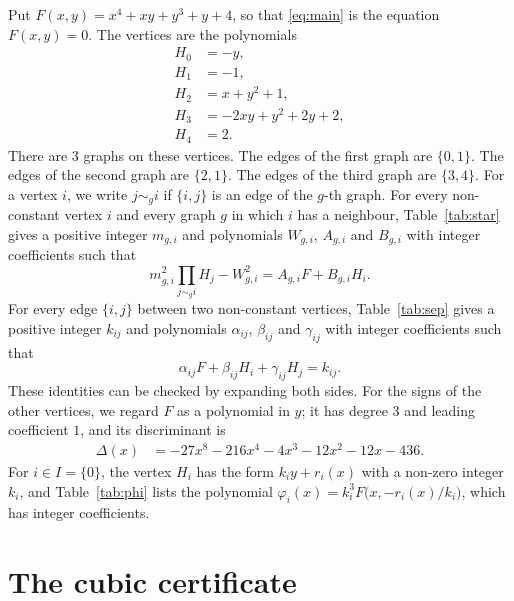 \documentclass[11pt]{article}
\begin{document}
Put $F(x,y)=x^{4}+xy+y^{3}+y+4$, so that \eqref{eq:main} is the equation $F(x,y)=0$. The vertices are the polynomials
\begin{align*}
H_{0}&=-y,\\
H_{1}&=-1,\\
H_{2}&=x+y^{2}+1,\\
H_{3}&=-2xy+y^{2}+2y+2,\\
H_{4}&=2.
\end{align*}
There are 3 graphs on these vertices. The edges of the first graph are $\{0,1\}$. The edges of the second graph are $\{2,1\}$. The edges of the third graph are $\{3,4\}$. For a vertex $i$, we write $j\sim_g i$ if $\{i,j\}$ is an edge of the $g$-th graph.
For every non-constant vertex $i$ and every graph $g$ in which $i$ has a neighbour, Table~\ref{tab:star} gives a positive integer $m_{g,i}$ and polynomials $W_{g,i}$, $A_{g,i}$ and $B_{g,i}$ with integer coefficients such that
\begin{equation}\label{eq:star}
m_{g,i}^2\prod_{j\sim_g i}H_j-W_{g,i}^2=A_{g,i}F+B_{g,i}H_i.
\end{equation}
For every edge $\{i,j\}$ between two non-constant vertices, Table~\ref{tab:sep} gives a positive integer $k_{ij}$ and polynomials $\alpha_{ij}$, $\beta_{ij}$ and $\gamma_{ij}$ with integer coefficients such that
\begin{equation}\label{eq:sep}
\alpha_{ij}F+\beta_{ij}H_i+\gamma_{ij}H_j=k_{ij}.
\end{equation}
These identities can be checked by expanding both sides.
For the signs of the other vertices, we regard $F$ as a polynomial in $y$; it has degree $3$ and leading coefficient $1$, and its discriminant is
\begin{align*}
\Delta(x)&=-27x^{8}-216x^{4}-4x^{3}-12x^{2}-12x-436.
\end{align*}
For $i\in I=\{0\}$, the vertex $H_i$ has the form $k_iy+r_i(x)$ with a non-zero integer $k_i$, and Table~\ref{tab:phi} lists the polynomial $\varphi_i(x)=k_i^3F\bigl(x,-r_i(x)/k_i\bigr)$, which has integer coefficients.

\section{The cubic certificate}
\end{document}
